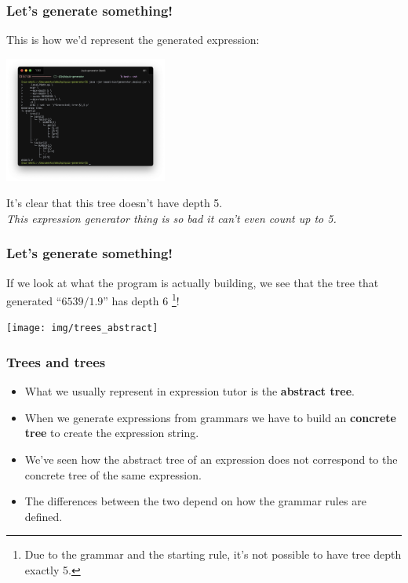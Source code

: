 \documentclass[t,aspectratio=1610]{beamer}
\begin{document}
\begin{frame}
\frametitle{Let's generate something!}
This is how we'd represent the generated expression:
\begin{center}
	\includegraphics[width=0.4\textwidth]{img/trees_concrete}
\end{center}
It's clear that this tree doesn't have depth 5. \\
\textit{This expression generator thing is so bad it can't even count up to 5.}
\end{frame}

\begin{frame}
\frametitle{Let's generate something!}
If we look at what the program is actually building, we see that the
tree that generated ``$ 6539 / 1.9 $'' has depth $ 6 $
\footnote{
	Due to the grammar and the starting rule, it's not possible
	to have tree depth exactly 5.
}!
\begin{center}
	\texttt{[image: img/trees\_abstract]} \\
\end{center}
\end{frame}

\begin{frame}
\frametitle{Trees and trees}
\begin{itemize}
\item What we usually represent in expression tutor is the
	  \textbf{abstract tree}.
\item When we generate expressions from grammars we have to build an
	  \textbf{concrete tree} to create the expression string.
\item We've seen how the abstract tree of an expression does not correspond
	  to the concrete tree of the same expression.
\item The differences between the two depend on how the grammar rules are
	  defined.
\end{itemize}
\end{frame}
\end{document}
